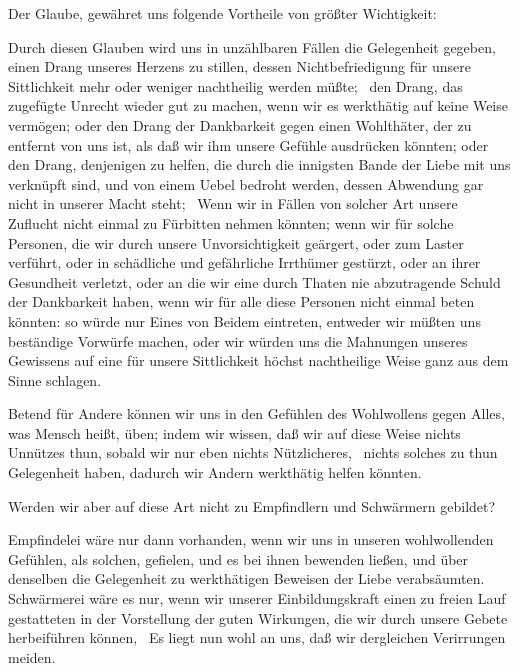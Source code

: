 \begin{aufza}
\item Der Glaube,  gewähret uns folgende Vortheile von größter Wichtigkeit:
\begin{aufzb}
\item Durch diesen Glauben wird uns in unzählbaren Fällen die Gelegenheit gegeben, einen Drang unseres Herzens zu stillen, dessen Nichtbefriedigung für unsere Sittlichkeit mehr oder weniger nachtheilig werden müßte; \zB\ den Drang, das zugefügte Unrecht wieder gut zu machen, wenn wir es werkthätig auf keine Weise vermögen; oder den Drang der Dankbarkeit gegen einen Wohlthäter, der zu entfernt von uns ist, als daß wir ihm unsere Gefühle ausdrücken könnten; oder den Drang, denjenigen zu helfen, die durch die innigsten Bande der Liebe mit uns verknüpft sind, und von einem Uebel bedroht werden, dessen Abwendung gar nicht in unserer Macht steht; \udgl\  Wenn wir in Fällen von solcher Art unsere Zuflucht nicht einmal zu Fürbitten nehmen könnten; wenn wir für solche Personen, die wir durch unsere Unvorsichtigkeit geärgert, oder zum Laster verführt, oder in schädliche und gefährliche Irrthümer gestürzt, oder an ihrer Gesundheit verletzt, oder an die wir eine durch Thaten nie abzutragende Schuld der Dankbarkeit haben, wenn wir für alle diese Personen nicht einmal beten könnten: so würde nur Eines von Beidem eintreten, entweder wir müßten uns beständige Vorwürfe machen, oder wir würden uns die Mahnungen unseres Gewissens auf eine für unsere Sittlichkeit höchst nachtheilige Weise ganz aus dem Sinne schlagen.
\item Betend für Andere können wir uns in den Gefühlen des Wohlwollens gegen Alles, was Mensch heißt, üben; indem wir wissen, daß wir auf diese Weise nichts Unnützes thun, sobald wir nur eben nichts Nützlicheres, \dh\ nichts solches zu thun Gelegenheit haben, dadurch wir Andern werkthätig helfen könnten.~\par
{} Werden wir aber auf diese Art nicht zu Empfindlern und Schwärmern gebildet?\par
{} Empfindelei wäre nur dann vorhanden, wenn wir uns in unseren wohlwollenden Gefühlen, als solchen, gefielen, und es bei ihnen bewenden ließen, und über denselben die Gelegenheit zu werkthätigen Beweisen der Liebe verabsäumten. Schwärmerei wäre es nur, wenn wir unserer Einbildungskraft einen zu freien Lauf gestatteten in der Vorstellung der guten Wirkungen, die wir durch unsere Gebete herbeiführen können, \udgl\  Es liegt nun wohl an uns, daß wir dergleichen Verirrungen meiden.

\end{aufzb}
\end{aufza}
